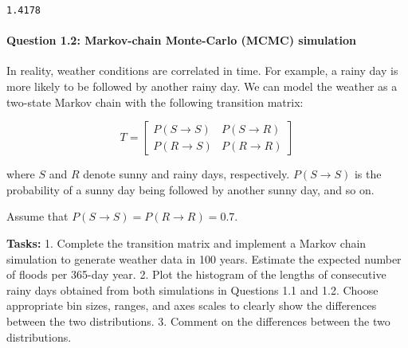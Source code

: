 \documentclass[11pt]{article}
\begin{document}
    \begin{Verbatim}[commandchars=\\\{\}]
1.4178
    \end{Verbatim}

    \paragraph{Question 1.2: Markov-chain Monte-Carlo (MCMC)
simulation}\label{question-1.2-markov-chain-monte-carlo-mcmc-simulation}

In reality, weather conditions are correlated in time. For example, a
rainy day is more likely to be followed by another rainy day. We can
model the weather as a two-state Markov chain with the following
transition matrix:

\[
T = 
\begin{bmatrix}
P(S \to S) & P(S \to R) \\
P(R \to S) & P(R \to R)
\end{bmatrix}
\]

where \(S\) and \(R\) denote sunny and rainy days, respectively.
\(P(S \to S)\) is the probability of a sunny day being followed by
another sunny day, and so on.

Assume that \(P(S \to S) = P(R \to R) = 0.7\).

\textbf{Tasks:} 1. Complete the transition matrix and implement a Markov
chain simulation to generate weather data in 100 years. Estimate the
expected number of floods per 365-day year. 2. Plot the histogram of the
lengths of consecutive rainy days obtained from both simulations in
Questions 1.1 and 1.2. Choose appropriate bin sizes, ranges, and axes
scales to clearly show the differences between the two distributions. 3.
Comment on the differences between the two distributions.
\end{document}
